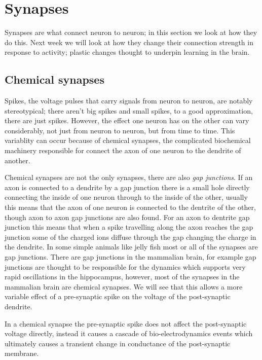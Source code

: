 \documentclass{article}
\begin{document}
\section*{Synapses}

Synapses are what connect neuron to neuron; in this section we look at
how they do this. Next week we will look at how they change their
connection strength in response to activity; plastic changes thought
to underpin learning in the brain.

\subsection*{Chemical synapses}

Spikes, the voltage pulses that carry signals from neuron to neuron,
are notably stereotypical; there aren't big spikes and small spikes,
to a good approximation, there are just spikes. However, the effect
one neuron has on the other can vary considerably, not just from
neuron to neuron, but from time to time. This variablity can occur
because of chemical synapses, the complicated biochemical machinery
responsible for connect the axon of one neuron to the dendrite of
another. 

Chemical synapses are not the only synapses, there are also
\textsl{gap junctions}. If an axon is connected to a dendrite by a gap
junction there is a small hole directly connecting the inside of one
neuron through to the inside of the other, usually this means that the
axon of one neuron is connected to the dentrite of the other, though
axon to axon gap junctions are also found. For an axon to dentrite gap
junction this means that when a spike travelling along the axon
reaches the gap junction some of the charged ions diffuse through the
gap changing the charge in the dendrite. In some simple animals like
jelly fish most or all of the synapses are gap junctions. There are
gap junctions in the mammalian brain, for example gap junctions are
thought to be responsible for the dynamics which supports very rapid
oscillations in the hippocampus, however, most of the synapses in the
mammalian brain are chemical synapses. We will see that this allows a
more variable effect of a pre-synaptic spike on the voltage of the
post-synaptic dendrite.

In a chemical synapse the pre-synaptic spike does not affect the
post-synaptic voltage directly, instead it causes a cascade of
bio-electrodynamics events which ultimately causes a transient change
in conductance of the post-synaptic membrane. 
\end{document}
